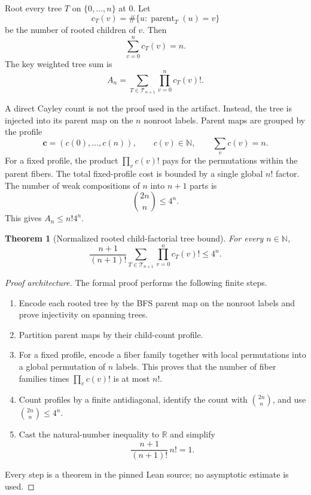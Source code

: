 \documentclass[11pt]{article}
\newtheorem{theorem}{Theorem}[section]
\newcommand{\N}{\mathbb N}
\newcommand{\R}{\mathbb R}
\newcommand{\Tree}{\mathcal T}
\begin{document}
Root every tree $T$ on $\{0,\dots,n\}$ at $0$.  Let
\[
  c_T(v)=\#\{u:\operatorname{parent}_T(u)=v\}
\]
be the number of rooted children of $v$.  Then
\begin{equation}\label{eq:child-sum}
  \sum_{v=0}^{n}c_T(v)=n.
\end{equation}
The key weighted tree sum is
\[
  A_n=\sum_{T\in\Tree_{n+1}}\prod_{v=0}^{n}c_T(v)!.
\]

A direct Cayley count is not the proof used in the artifact.  Instead, the tree is injected into its parent map on the $n$ nonroot labels.  Parent maps are grouped by the profile
\[
  \mathbf c=(c(0),\dots,c(n)),
  \qquad c(v)\in\N,
  \qquad \sum_v c(v)=n.
\]
For a fixed profile, the product $\prod_v c(v)!$ pays for the permutations within the parent fibers.  The total fixed-profile cost is bounded by a single global $n!$ factor.  The number of weak compositions of $n$ into $n+1$ parts is
\begin{equation}\label{eq:profile-count}
  \binom{2n}{n}\le4^n.
\end{equation}
This gives $A_n\le n!4^n$.

\begin{theorem}[Normalized rooted child-factorial tree bound]\label{thm:tree-profile}
For every $n\in\N$,
\begin{equation}\label{eq:tree-profile-main}
  \frac{n+1}{(n+1)!}
  \sum_{T\in\Tree_{n+1}}
  \prod_{v=0}^{n}c_T(v)!
  \le4^n.
\end{equation}
\end{theorem}

\begin{proof}[Proof architecture]
The formal proof performs the following finite steps.
\begin{enumerate}[leftmargin=2.5em]
  \item Encode each rooted tree by the BFS parent map on the nonroot labels and prove injectivity on spanning trees.
  \item Partition parent maps by their child-count profile.
  \item For a fixed profile, encode a fiber family together with local permutations into a global permutation of $n$ labels.  This proves that the number of fiber families times $\prod_v c(v)!$ is at most $n!$.
  \item Count profiles by a finite antidiagonal, identify the count with $\binom{2n}{n}$, and use $\binom{2n}{n}\le4^n$.
  \item Cast the natural-number inequality to $\R$ and simplify
  \[
    \frac{n+1}{(n+1)!}\,n!=1.
  \]
\end{enumerate}
Every step is a theorem in the pinned Lean source; no asymptotic estimate is used.
\end{proof}
\end{document}
